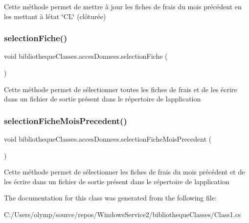 Cette méthode permet de mettre à jour les fiches de frais du mois précédent en les mettant à l\textquotesingle{}état \char`\"{}\+C\+L\char`\"{} (clôturée) 

\mbox{\label{classbibliotheque_classes_1_1acces_donnees_a3d5707c0c32ffef3ffb96024c429962c}} 
\subsubsection{\texorpdfstring{selection\+Fiche()}{selectionFiche()}}
{\footnotesize\ttfamily void bibliotheque\+Classes.\+acces\+Donnees.\+selection\+Fiche (\begin{DoxyParamCaption}{ }\end{DoxyParamCaption})}



Cette méthode permet de sélectionner toutes les fiches de frais et de les écrire dans un fichier de sortie présent dans le répertoire de l\textquotesingle{}application 

\mbox{\label{classbibliotheque_classes_1_1acces_donnees_a28c549fe1997665d275fd37d97414990}} 
\subsubsection{\texorpdfstring{selection\+Fiche\+Mois\+Precedent()}{selectionFicheMoisPrecedent()}}
{\footnotesize\ttfamily void bibliotheque\+Classes.\+acces\+Donnees.\+selection\+Fiche\+Mois\+Precedent (\begin{DoxyParamCaption}{ }\end{DoxyParamCaption})}



Cette méthode permet de sélectionner les fiches de frais du mois précédent et de les écrire dans un fichier de sortie présent dans le répertoire de l\textquotesingle{}application 



The documentation for this class was generated from the following file\+:\begin{DoxyCompactItemize}
\item 
C\+:/\+Users/olymp/source/repos/\+Windows\+Service2/bibliotheque\+Classes/Class1.\+cs\end{DoxyCompactItemize}

